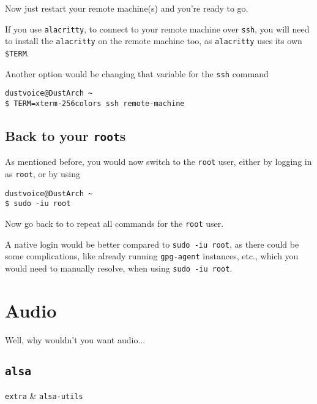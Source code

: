 \documentclass[10pt]{dustdoc}
\begin{document}
Now just restart your remote machine(s) and you’re ready to go.

\begin{NOTE}
    If you use \texttt{alacritty}, to connect to your remote machine over \texttt{ssh}, you will need to install the \texttt{alacritty} on the remote machine too, as \texttt{alacritty} uses its own \texttt{\$TERM}.

    Another option would be changing that variable for the \texttt{ssh} command

    \begin{verbatim}
dustvoice@DustArch ~
$ TERM=xterm-256colors ssh remote-machine
    \end{verbatim}
\end{NOTE}

\subsection{Back to your \texttt{root}s}
\label{sec:back-to-your-roots}

As mentioned before, you would now switch to the \texttt{root} user, either by logging in as \texttt{root}, or by using

\begin{verbatim}
dustvoice@DustArch ~
$ sudo -iu root
\end{verbatim}

Now go back to  to repeat all commands for the \texttt{root} user.

\begin{WARNING}
    A native login would be better compared to \texttt{sudo -iu root}, as there could be some complications, like already running \texttt{gpg-agent} instances, etc., which you would need to manually resolve, when using \texttt{sudo -iu root}.
\end{WARNING}

\section{Audio}
\label{sec:audio}

Well, why wouldn’t you want audio...

\subsection{\texttt{alsa}}
\label{sec:alsa}

\begin{packagetable}
    \texttt{extra} & \texttt{alsa-utils} \\ 
\end{packagetable}
\end{document}
